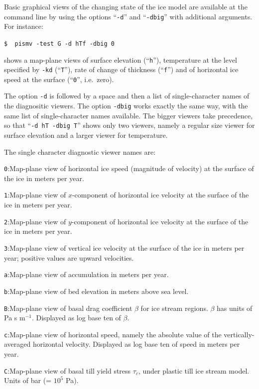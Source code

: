\documentclass[11pt,final]{amsart}
\renewcommand{\t}[1]{\texttt{#1}}
\begin{document}
Basic graphical views of the changing state of the ice model are available at the command line by using the options ``\t{-d}'' and ``\t{-dbig}'' with additional arguments.  For instance:

\verb|$  pismv -test G -d hTf -dbig 0|

\noindent shows a map-plane views of surface elevation (``\t{h}''), temperature at the level specified by \t{-kd} (``\t{T}''), rate of change of thickness (``\t{f}'') and of horizontal ice speed at the surface (``\t{0}'', i.e.~zero).

The option \t{-d} is followed by a space and then a list of single-character names of the diagnositic viewers.  The option \t{-dbig} works exactly the same way, with the same list of single-character names available.  The bigger viewers take precedence, so that ``\t{-d hT -dbig T}'' shows only two viewers, namely a regular size viewer for surface elevation and a larger viewer for temperature.

The single character diagnostic viewer names are:

\verb|0|:\quad Map-plane view of horizontal ice speed (magnitude of velocity) at the surface of the ice in meters per year.

\verb|1|:\quad Map-plane view of $x$-component of horizontal ice velocity at the surface of the ice in meters per year.

\verb|2|:\quad Map-plane view of $y$-component of horizontal ice velocity at the surface of the ice in meters per year.

\verb|3|:\quad Map-plane view of vertical ice velocity at the surface of the ice in meters per year; positive values are upward velocities.

\verb|a|:\quad Map-plane view of accumulation in meters per year.

\verb|b|:\quad Map-plane view of bed elevation in meters above sea level.

\verb|B|:\quad Map-plane view of basal drag coefficient $\beta$ for ice stream regions.  $\beta$ has units of Pa s $\text{m}^{-1}$.  Displayed as log base ten of $\beta$.

\verb|c|:\quad Map-plane view of horizontal speed, namely the absolute value of the vertically-averaged horizontal velocity.  Displayed as log base ten of speed in meters per year.

\verb|C|:\quad Map-plane view of basal till yield stress $\tau_c$, under plastic till ice stream model.  Units of bar (= $10^5$ Pa).
\end{document}
